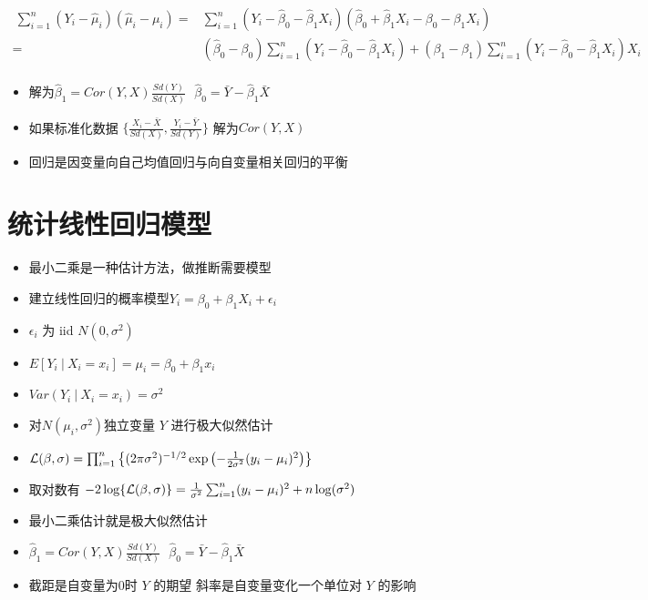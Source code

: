 \documentclass[]{book}
\providecommand{\tightlist}{%
  \setlength{\itemsep}{0pt}\setlength{\parskip}{0pt}}
\begin{document}
\begin{align} \
\sum_{i=1}^n (Y_i - \hat \mu_i) (\hat \mu_i - \mu_i) 
= & \sum_{i=1}^n (Y_i - \hat\beta_0 - \hat\beta_1 X_i) (\hat \beta_0 + \hat \beta_1 X_i - \beta_0 - \beta_1 X_i) \\
= & (\hat \beta_0 - \beta_0) \sum_{i=1}^n (Y_i - \hat\beta_0 - \hat \beta_1 X_i) + (\beta_1 - \beta_1)\sum_{i=1}^n (Y_i - \hat\beta_0 - \hat \beta_1 X_i)X_i\\
\end{align}

\begin{itemize}
\tightlist
\item
  解为\(\hat \beta_1 = Cor(Y, X) \frac{Sd(Y)}{Sd(X)} ~~~ \hat \beta_0 = \bar Y - \hat \beta_1 \bar X\)
\item
  如果标准化数据 \(\{ \frac{X_i - \bar X}{Sd(X)}, \frac{Y_i - \bar Y}{Sd(Y)}\}\) 解为\(Cor(Y, X)\)
\item
  回归是因变量向自己均值回归与向自变量相关回归的平衡
\end{itemize}

\section{统计线性回归模型}

\begin{itemize}
\tightlist
\item
  最小二乘是一种估计方法，做推断需要模型
\item
  建立线性回归的概率模型\(Y_i = \beta_0 + \beta_1 X_i + \epsilon_{i}\)
\item
  \(\epsilon_{i}\) 为 iid \(N(0, \sigma^2)\)
\item
  \(E[Y_i ~|~ X_i = x_i] = \mu_i = \beta_0 + \beta_1 x_i\)
\item
  \(Var(Y_i ~|~ X_i = x_i) = \sigma^2\)
\item
  对\(N(\mu_i, \sigma^2)\)独立变量 \(Y\) 进行极大似然估计
\item
  \({\cal L}(\beta, \sigma) = \prod_{i=1}^n \left\{(2 \pi \sigma^2)^{-1/2}\exp\left(-\frac{1}{2\sigma^2}(y_i - \mu_i)^2 \right) \right\}\)
\item
  取对数有 \(-2 \log\{ {\cal L}(\beta, \sigma) \} = \frac{1}{\sigma^2} \sum_{i=1}^n (y_i - \mu_i)^2 + n\log(\sigma^2)\)
\item
  最小二乘估计就是极大似然估计
\item
  \(\hat \beta_1 = Cor(Y, X) \frac{Sd(Y)}{Sd(X)} ~~~ \hat \beta_0 = \bar Y - \hat \beta_1 \bar X\)
\item
  截距是自变量为0时 \(Y\) 的期望 斜率是自变量变化一个单位对 \(Y\) 的影响
\end{itemize}
\end{document}
